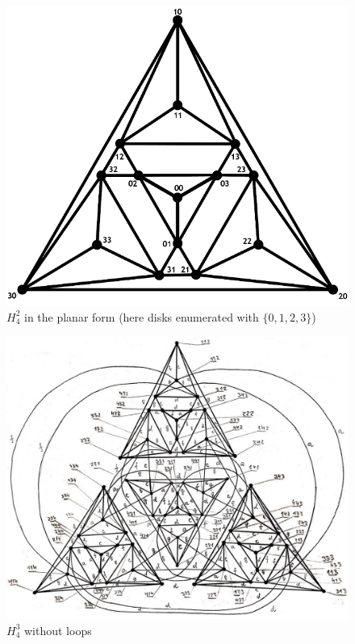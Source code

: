 \documentclass[a4paper,12pt]{amsart}
\begin{document}
\begin{figure}[h]
	\includegraphics[scale=0.34]{H4_2.png}
	\caption{$H_4^2$ in the planar form (here disks enumerated with $\{0, 1, 2, 3\}$)}
\end{figure}

\begin{figure}[h]
	\includegraphics[scale=0.3]{H4_schreier.jpg}
	\caption{$H_4^3$ without loops}
\end{figure}

\newpage
\end{document}
